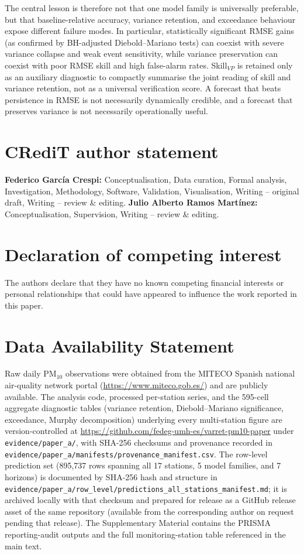 \documentclass[3p,times,single-column]{elsarticle}
\begin{document}
The central lesson is therefore not that one model family is universally preferable, but that baseline-relative accuracy, variance retention, and exceedance behaviour expose different failure modes. In particular, statistically significant RMSE gains (as confirmed by BH-adjusted Diebold--Mariano tests) can coexist with severe variance collapse and weak event sensitivity, while variance preservation can coexist with poor RMSE skill and high false-alarm rates. Skill$_{VP}$ is retained only as an auxiliary diagnostic to compactly summarise the joint reading of skill and variance retention, not as a universal verification score. A forecast that beats persistence in RMSE is not necessarily dynamically credible, and a forecast that preserves variance is not necessarily operationally useful.

\section*{CRediT author statement}
\textbf{Federico Garc\'ia Crespi:} Conceptualisation, Data curation, Formal analysis, Investigation, Methodology, Software, Validation, Visualisation, Writing -- original draft, Writing -- review \& editing. \textbf{Julio Alberto Ramos Mart\'inez:} Conceptualisation, Supervision, Writing -- review \& editing.

\section*{Declaration of competing interest}
The authors declare that they have no known competing financial interests or personal relationships that could have appeared to influence the work reported in this paper.

\section*{Data Availability Statement}
Raw daily PM$_{10}$ observations were obtained from the MITECO Spanish national air-quality network portal (\url{https://www.miteco.gob.es/}) and are publicly available. The analysis code, processed per-station series, and the 595-cell aggregate diagnostic tables (variance retention, Diebold--Mariano significance, exceedance, Murphy decomposition) underlying every multi-station figure are version-controlled at \url{https://github.com/fedeg-umh-es/varret-pm10-paper} under \texttt{evidence/paper\_a/}, with SHA-256 checksums and provenance recorded in \texttt{evidence/paper\_a/manifests/provenance\_manifest.csv}. The row-level prediction set (895{,}737 rows spanning all 17 stations, 5 model families, and 7 horizons) is documented by SHA-256 hash and structure in \texttt{evidence/paper\_a/row\_level/predictions\_all\_stations\_manifest.md}; it is archived locally with that checksum and prepared for release as a GitHub release asset of the same repository (available from the corresponding author on request pending that release). The Supplementary Material contains the PRISMA reporting-audit outputs and the full monitoring-station table referenced in the main text.
\end{document}
